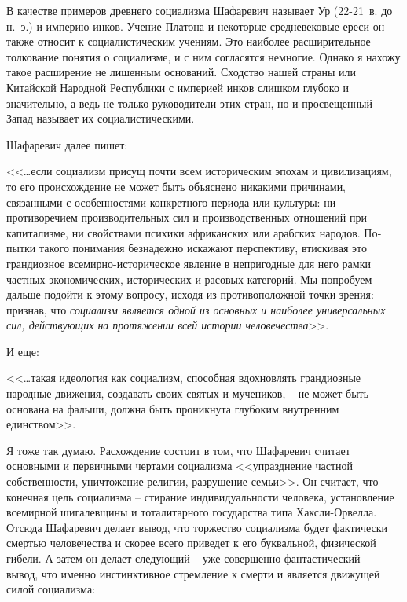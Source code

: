\documentclass{book}
\begin{document}
В качестве примеров древнего социализма Шафаревич называет Ур (22-21~в. до н.~э.) и империю инков. Учение Платона и некоторые средневековые ереси он также относит к социалистическим учениям. Это наиболее расширительное толкование понятия о социализме, и с ним согласятся немногие. Однако я нахожу такое расширение не лишенным оснований. Сходст­во нашей страны или Китайской Народной Республики с импе­рией инков слишком глубоко и значительно, а ведь не только руководители этих стран, но и просвещенный Запад называет их социалистическими.

Шафаревич далее пишет:

<<\ldots если социализм присущ почти всем историческим эпохам и цивилизациям, то его 
происхождение не может быть объяс­нено никакими причинами, связанными с особенностями 
кон­кретного периода или культуры: ни противоречием производи­тельных сил и 
производственных отношений при капитализме, ни свойствами психики африканских или 
арабских народов. По­пытки такого понимания безнадежно искажают перспективу, втискивая 
это грандиозное всемирно-историческое явление в непригодные для него рамки частных 
экономических, истори­ческих и расовых категорий. Мы попробуем дальше подойти к этому 
вопросу, исходя из противоположной точки зрения: признав, что \textit{социализм 
является одной из основных и наибо­лее универсальных сил, действующих на протяжении 
всей исто­рии человечества}>>.%

И еще:

<<\ldots такая идеология как социализм, способная вдохновлять грандиозные народные движения, создавать своих святых и му­чеников, -- не может быть основана на фальши, должна быть проникнута глубоким внутренним единством>>.%

Я тоже так думаю. Расхождение состоит в том, что Шафаревич считает основными и первичными чертами социализма <<упразднение частной собственности, уничтожение религии, раз­рушение семьи>>. Он считает, что конечная цель социализма -- стирание индивидуальности человека, установление всемирной шигалевщины и тоталитарного государства типа Хаксли-Орвелла. Отсюда Шафаревич делает вывод, что торжество социализ­ма будет фактически смертью человечества и скорее всего при­ведет к его буквальной, физической гибели. А затем он делает следующий -- уже совершенно фантастический -- вывод, что именно инстинктивное стремление к смерти и является движу­щей силой социализма:
\end{document}
